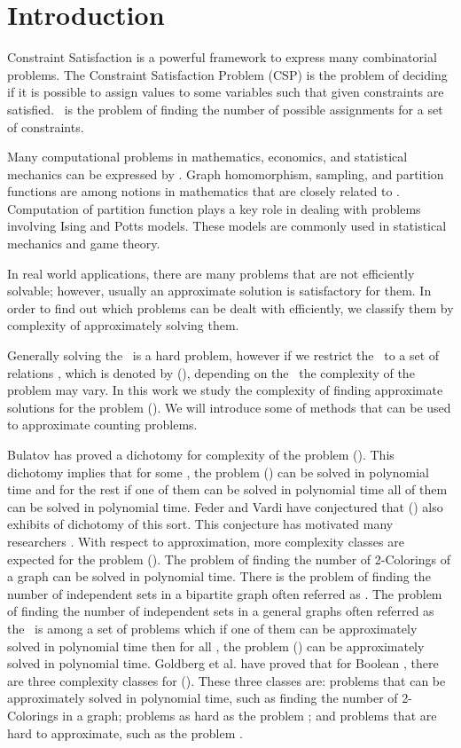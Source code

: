 \chapter{Introduction}
Constraint Satisfaction is a powerful framework to express many combinatorial problems.
The Constraint Satisfaction Problem (CSP) is the problem of deciding if it is possible to
assign values to some variables such that given constraints are satisfied. \ccsp\ 
is the problem of finding the number of possible assignments for a set of constraints.

Many computational problems in mathematics, economics, and statistical mechanics
can be expressed by \ccsp\@. Graph homomorphism, sampling,
and partition functions are among notions in mathematics
that are closely related to \ccsp\@. Computation of partition function plays a key role
in dealing with problems involving Ising and Potts models. These models are
commonly used in statistical mechanics and game theory.
 
In real world applications, there are many problems that are not efficiently solvable;
however, usually an approximate solution is satisfactory for them. 
In order to find out which problems can be dealt with efficiently, we classify them
by complexity of approximately solving them.

Generally solving the \ccsp\ is a hard problem, however if we restrict the
\ccsp\ to a set of relations \mrelset, which is denoted by \ccsp(\mrelset),
depending on the \mrelset\ the complexity of the problem may vary.
In this work we study the complexity of finding approximate solutions for the 
problem \ccsp(\mrelset).
We will introduce some of methods that can be used to approximate counting problems.

Bulatov \cite{Bulatov} has proved a dichotomy for complexity of the
problem \ccsp(\mrelset). This dichotomy implies that 
for some \mrelset, the problem \ccsp(\mrelset) can be solved in polynomial time
and for the rest if one of them can be solved in polynomial time
all of them can be solved in polynomial time.
Feder and Vardi \cite{cspconj} have conjectured that \ccsp(\mrelset) also exhibits of dichotomy of
this sort. This conjecture has motivated many researchers \cite{dur628, recent08, valeriote}.
With respect to approximation, more complexity classes are expected for the problem \ccsp(\mrelset).
The problem of finding the number of 2-Colorings of a graph can be solved 
in polynomial time. There is the problem of finding the
number of independent sets in a bipartite graph often referred as \cbis\@.
The problem of finding the number of independent sets in a general graphs often referred as
the \cisp\ is among a set of problems which if one of them can be approximately solved
in polynomial time then for all \mrelset, the problem \ccsp(\mrelset) can be approximately
solved in polynomial time.
Goldberg et al. \cite{Trichotomy} have proved that for Boolean \mrelset,
there are three complexity classes for \ccsp(\mrelset)\@. These three classes are:
problems that can be approximately solved in polynomial time, such as finding the
number of 2-Colorings in a graph; problems as hard as the problem \cbis; and
problems that are hard to approximate, such as the problem \cisp\@.

